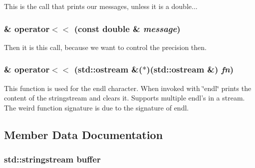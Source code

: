 This is the call that prints our messages, unless it is a double... \hypertarget{classJKBuilder_1_1IOManager_a127779d1803b6ffe9e44a3a36e46910e}{
\subsubsection[{operator$<$$<$}]{ \& operator$<$$<$ (const double \& {\em message})}}
\label{classJKBuilder_1_1IOManager_a127779d1803b6ffe9e44a3a36e46910e}


Then it is this call, because we want to control the precision then. \hypertarget{classJKBuilder_1_1IOManager_a4ab394f377d37c6598659317320ec38c}{
\subsubsection[{operator$<$$<$}]{ \& operator$<$$<$ (std::ostream \&($\ast$)(std::ostream \&) {\em fn})}}
\label{classJKBuilder_1_1IOManager_a4ab394f377d37c6598659317320ec38c}


This function is used for the endl character. When invoked with \char`\"{}endl\char`\"{} prints the content of the stringstream and clears it. Supports multiple endl's in a stream. The weird function signature is due to the signature of endl. 

\subsection{Member Data Documentation}
\hypertarget{classJKBuilder_1_1IOManager_adbf6a7492c6521b38c1510aebe307770}{
\subsubsection[{buffer}]{\setlength{\rightskip}{0pt plus 5cm}std::stringstream {\bf buffer}}}
\label{classJKBuilder_1_1IOManager_adbf6a7492c6521b38c1510aebe307770}


